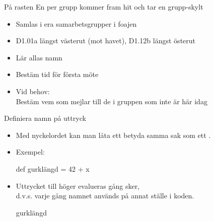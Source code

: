 \ifkompendium\else
\begin{SlideExtra}{På rasten}
En per grupp kommer fram hit och tar en grupp-skylt
\begin{itemize}
  \item Samlas i era samarbetsgrupper i foajen
  \item D1.01a längst västerut (mot havet), D1.12b längst österut
  \item Lär allas namn
  \item Bestäm tid för första möte
  \item Vid behov: \\ Bestäm vem som mejlar till de i gruppen som inte är här idag 
\end{itemize}  
\end{SlideExtra}
\fi


\begin{Slide}{Definiera namn på uttryck}
\begin{itemize}
\item Med nyckelordet  kan man låta ett  betyda samma sak som ett .
\item Exempel:
\begin{Code}
def gurklängd = 42 + x
\end{Code}
\item Uttrycket till höger evalueras  gång  sker,\\
d.v.s. varje gång namnet används på annat ställe i koden.
\begin{Code}
gurklängd
\end{Code}

\end{itemize}
\end{Slide}

